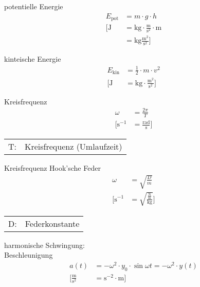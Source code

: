 \begin{karte}{potentielle Energie}
    \begin{align*}
        E_\text{pot} &= m \cdot g \cdot h \\
        \bigg[
            \text{J} &= \text{kg} \cdot \frac{\text{m}}{\text{s}^2} \cdot \text{m} \\
            &= \text{kg}\frac{\text{m}^2}{\text{s}^2} 
            \bigg]
    \end{align*}
\end{karte}

\begin{karte}{kinteische Energie}
    \begin{align*}
        E_\text{kin} &= \frac{1}{2} \cdot m \cdot v^2 \\
        \bigg[
            \text{J} &= \text{kg} \cdot \frac{\text{m}^2}{\text{s}^2} 
            \bigg]
    \end{align*}
\end{karte}

\begin{karte}{Kreisfrequenz}
    \begin{align*}
        \omega &= \frac{2\pi}{T} \\
        \bigg[ \text{s}^{-1} &= \frac{\text{rad}}{\text{s}} \bigg]
    \end{align*}
    \begin{tabular}[t]{cl}
        T:& Kreisfrequenz (Umlaufzeit)
    \end{tabular}
\end{karte}

\begin{karte}{Kreisfrequenz Hook'sche Feder}
    \begin{align*}
        \omega &= \sqrt{\frac{D}{m}} \\
        \bigg[ \text{s}^{-1} &= \sqrt{\frac{\frac{\text{N}}{\text{m}}}{\text{kg}}} \bigg]
    \end{align*}
    \begin{tabular}[t]{cl}
        D:& Federkonstante 
    \end{tabular}
\end{karte}

\begin{karte}{harmonische Schwingung:\\Beschleunigung}
    \begin{align*}
        a(t) &= - \omega^2 \cdot y_0 \cdot \sin \omega t = - \omega^2 \cdot y(t) \\
        \bigg[ \frac{\text{m}}{\text{s}^2} &= \text{s}^{-2} \cdot \text{m} \bigg]
    \end{align*}
\end{karte}

